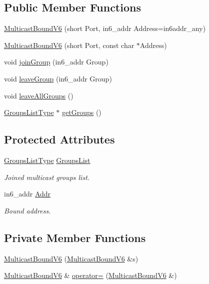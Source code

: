 \subsection*{Public Member Functions}
\begin{DoxyCompactItemize}
\item 
\hyperlink{classMulticastBoundV6_aeff8613d8b6c8c7e5ecbdbbc2b73bf8a}{Multicast\+Bound\+V6} (short Port, in6\+\_\+addr Address=in6addr\+\_\+any)
\item 
\hyperlink{classMulticastBoundV6_a90c23a309b94b8e997dff8177a478ab2}{Multicast\+Bound\+V6} (short Port, const char $\ast$Address)
\item 
void \hyperlink{classMulticastBoundV6_a8ad4a26d4469cc1ffd3f451d4ce8ebd9}{join\+Group} (in6\+\_\+addr Group)
\item 
void \hyperlink{classMulticastBoundV6_a7264da712de9e131b3a3ab1e8a86942a}{leave\+Group} (in6\+\_\+addr Group)
\item 
void \hyperlink{classMulticastBoundV6_a94ea6a1c81af951376b82d23d58a7acd}{leave\+All\+Groups} ()
\item 
\hyperlink{MulticastBound_8h_a9584173a620a338ea7d88264229e36dd}{Groups\+List\+Type} $\ast$ \hyperlink{classMulticastBoundV6_afcb2560007274a519ed11101bc95fbee}{get\+Groups} ()
\end{DoxyCompactItemize}
\subsection*{Protected Attributes}
\begin{DoxyCompactItemize}
\item 
\hyperlink{MulticastBound_8h_a9584173a620a338ea7d88264229e36dd}{Groups\+List\+Type} \hyperlink{classMulticastBoundV6_a6ccdbb56f54017f5a4372eb816b5b077}{Groups\+List}
\begin{DoxyCompactList}\small\item\em Joined multicast groups list. \end{DoxyCompactList}\item 
in6\+\_\+addr \hyperlink{classMulticastBoundV6_a792a38740cf29b50fb74785b12358988}{Addr}
\begin{DoxyCompactList}\small\item\em Bound address. \end{DoxyCompactList}\end{DoxyCompactItemize}
\subsection*{Private Member Functions}
\begin{DoxyCompactItemize}
\item 
\hyperlink{classMulticastBoundV6_a207359a0e4b496dfe9a00ceb33be4c18}{Multicast\+Bound\+V6} (\hyperlink{classMulticastBoundV6}{Multicast\+Bound\+V6} \&s)
\item 
\hyperlink{classMulticastBoundV6}{Multicast\+Bound\+V6} \& \hyperlink{classMulticastBoundV6_a5bcf54776fe97dd2ffd26a36de092284}{operator=} (\hyperlink{classMulticastBoundV6}{Multicast\+Bound\+V6} \&)
\end{DoxyCompactItemize}
